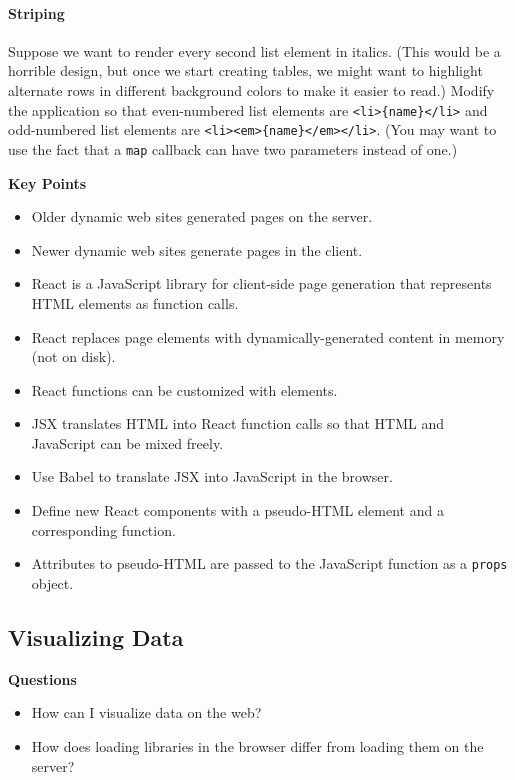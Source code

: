 \paragraph{Striping}\label{striping}

Suppose we want to render every second list element in italics. (This
would be a horrible design, but once we start creating tables, we might
want to highlight alternate rows in different background colors to make
it easier to read.) Modify the application so that even-numbered list
elements are
\texttt{\textless{}li\textgreater{}\{name\}\textless{}/li\textgreater{}}
and odd-numbered list elements are
\texttt{\textless{}li\textgreater{}\textless{}em\textgreater{}\{name\}\textless{}/em\textgreater{}\textless{}/li\textgreater{}}.
(You may want to use the fact that a \texttt{map} callback can have two
parameters instead of one.)

\textbf{Key Points}

\begin{itemize}
\tightlist
\item
  Older dynamic web sites generated pages on the server.
\item
  Newer dynamic web sites generate pages in the client.
\item
  React is a JavaScript library for client-side page generation that
  represents HTML elements as function calls.
\item
  React replaces page elements with dynamically-generated content in
  memory (not on disk).
\item
  React functions can be customized with elements.
\item
  JSX translates HTML into React function calls so that HTML and
  JavaScript can be mixed freely.
\item
  Use Babel to translate JSX into JavaScript in the browser.
\item
  Define new React components with a pseudo-HTML element and a
  corresponding function.
\item
  Attributes to pseudo-HTML are passed to the JavaScript function as a
  \texttt{props} object.
\end{itemize}

\hypertarget{s:vis}{\subsection{Visualizing Data}\label{s:vis}}

\textbf{Questions}

\begin{itemize}
\tightlist
\item
  How can I visualize data on the web?
\item
  How does loading libraries in the browser differ from loading them on
  the server?
\end{itemize}

